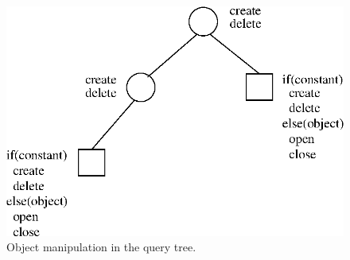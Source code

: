 \documentclass [11pt, a4paper] {article}
\begin{document}
\begin{figure}[!hbp]
  \begin{center}
  \includegraphics{querytree.eps}
  \end{center}
  \caption{Object manipulation in the query tree.}
  \label{fig:querytree}
\end{figure}
\end{document}
